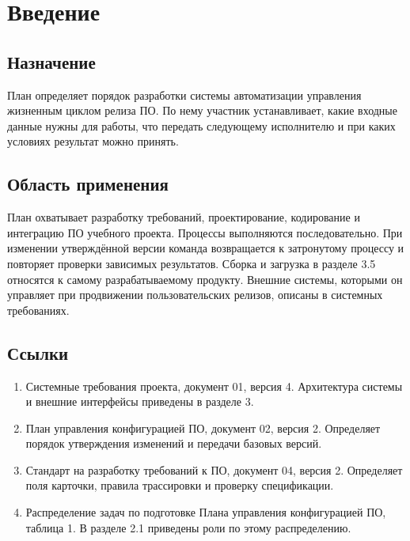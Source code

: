 \documentclass{tpks}
\begin{document}
\makeheader
\begin{changelog}
\end{changelog}

\section{Введение}
\subsection{Назначение}
План определяет порядок разработки системы автоматизации управления жизненным циклом релиза ПО. По нему участник устанавливает, какие входные данные нужны для работы, что передать следующему исполнителю и при каких условиях результат можно принять.

\subsection{Область применения}
План охватывает разработку требований, проектирование, кодирование и интеграцию ПО учебного проекта. Процессы выполняются последовательно. При изменении утверждённой версии команда возвращается к затронутому процессу и повторяет проверки зависимых результатов. Сборка и загрузка в разделе 3.5 относятся к самому разрабатываемому продукту. Внешние системы, которыми он управляет при продвижении пользовательских релизов, описаны в системных требованиях.

\subsection{Ссылки}
\begin{enumerate}
\item Системные требования проекта, документ 01, версия 4. Архитектура системы и внешние интерфейсы приведены в разделе 3.
\item План управления конфигурацией ПО, документ 02, версия 2. Определяет порядок утверждения изменений и передачи базовых версий.
\item Стандарт на разработку требований к ПО, документ 04, версия 2. Определяет поля карточки, правила трассировки и проверку спецификации.
\item Распределение задач по подготовке Плана управления конфигурацией ПО, таблица 1. В разделе 2.1 приведены роли по этому распределению.
\end{enumerate}
\end{document}
